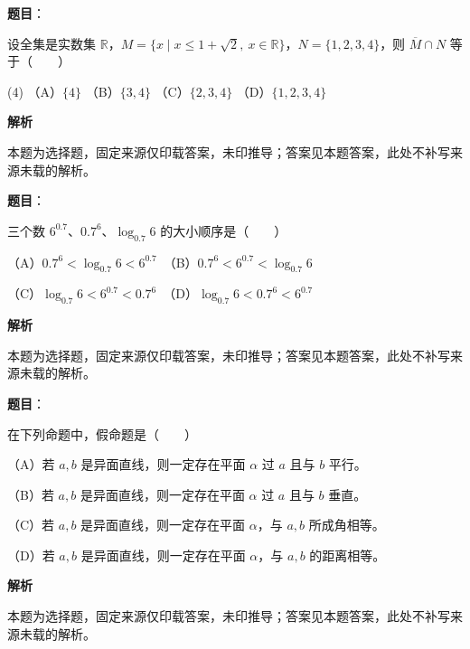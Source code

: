 

\begin{answer}

\textbf{题目}：

设全集是实数集 $\mathbb R$，$M=\{x\mid x\le 1+\sqrt2,\ x\in\mathbb R\}$，$N=\{1,2,3,4\}$，则 $\overline M\cap N$ 等于\mbox{（　　）}

\begin{gkopts}(4)
\task （A）$\{4\}$
\task （B）$\{3,4\}$
\task （C）$\{2,3,4\}$
\task （D）$\{1,2,3,4\}$
\end{gkopts}

\textbf{解析}

本题为选择题，固定来源仅印载答案，未印推导；答案见本题答案，此处不补写来源未载的解析。


\end{answer}
\begin{answer}

\textbf{题目}：

三个数 $6^{0.7}$、$0.7^6$、$\log_{0.7}6$ 的大小顺序是\mbox{（　　）}

（A）$0.7^6<\log_{0.7}6<6^{0.7}$　（B）$0.7^6<6^{0.7}<\log_{0.7}6$

（C）$\log_{0.7}6<6^{0.7}<0.7^6$　（D）$\log_{0.7}6<0.7^6<6^{0.7}$

\textbf{解析}

本题为选择题，固定来源仅印载答案，未印推导；答案见本题答案，此处不补写来源未载的解析。


\end{answer}
\begin{answer}

\textbf{题目}：

在下列命题中，假命题是\mbox{（　　）}

（A）若 $a,b$ 是异面直线，则一定存在平面 $\alpha$ 过 $a$ 且与 $b$ 平行。

（B）若 $a,b$ 是异面直线，则一定存在平面 $\alpha$ 过 $a$ 且与 $b$ 垂直。

（C）若 $a,b$ 是异面直线，则一定存在平面 $\alpha$，与 $a,b$ 所成角相等。

（D）若 $a,b$ 是异面直线，则一定存在平面 $\alpha$，与 $a,b$ 的距离相等。

\textbf{解析}

本题为选择题，固定来源仅印载答案，未印推导；答案见本题答案，此处不补写来源未载的解析。


\end{answer}
